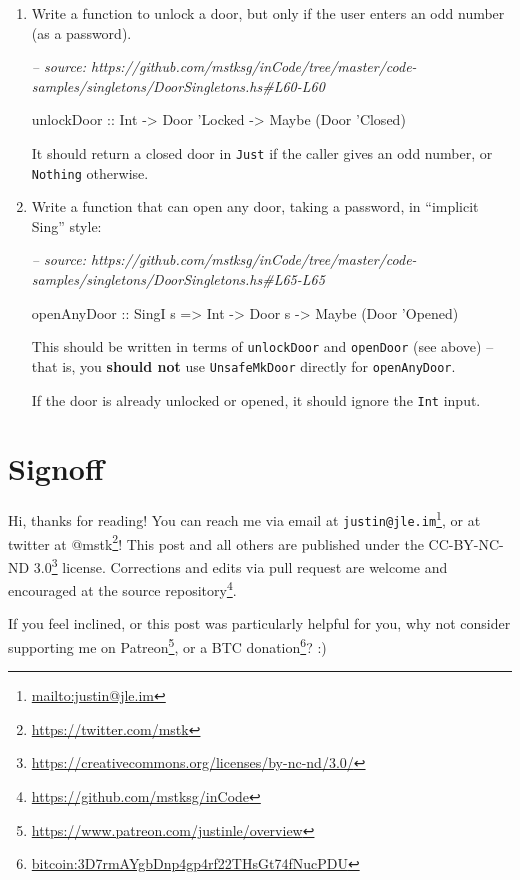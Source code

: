 \documentclass[]{article}
\newenvironment{Shaded}{}{}
\newcommand{\CommentTok}[1]{\textcolor[rgb]{0.38,0.63,0.69}{\textit{#1}}}
\newcommand{\DataTypeTok}[1]{\textcolor[rgb]{0.56,0.13,0.00}{#1}}
\newcommand{\NormalTok}[1]{#1}
\newcommand{\OtherTok}[1]{\textcolor[rgb]{0.00,0.44,0.13}{#1}}
\renewcommand{\href}[2]{#2\footnote{\url{#1}}}
\begin{document}
\begin{enumerate}
\def\labelenumi{\arabic{enumi}.}
\item
  Write a function to unlock a door, but only if the user enters an odd number
  (as a password).

\begin{Shaded}
\begin{Highlighting}[]
\CommentTok{-- source: https://github.com/mstksg/inCode/tree/master/code-samples/singletons/DoorSingletons.hs#L60-L60}

\OtherTok{unlockDoor ::} \DataTypeTok{Int} \OtherTok{->} \DataTypeTok{Door}\NormalTok{ '}\DataTypeTok{Locked} \OtherTok{->} \DataTypeTok{Maybe}\NormalTok{ (}\DataTypeTok{Door}\NormalTok{ '}\DataTypeTok{Closed}\NormalTok{)}
\end{Highlighting}
\end{Shaded}

  It should return a closed door in \texttt{Just} if the caller gives an odd
  number, or \texttt{Nothing} otherwise.
\item
  Write a function that can open any door, taking a password, in ``implicit
  Sing'' style:

\begin{Shaded}
\begin{Highlighting}[]
\CommentTok{-- source: https://github.com/mstksg/inCode/tree/master/code-samples/singletons/DoorSingletons.hs#L65-L65}

\OtherTok{openAnyDoor ::} \DataTypeTok{SingI}\NormalTok{ s }\OtherTok{=>} \DataTypeTok{Int} \OtherTok{->} \DataTypeTok{Door}\NormalTok{ s }\OtherTok{->} \DataTypeTok{Maybe}\NormalTok{ (}\DataTypeTok{Door}\NormalTok{ '}\DataTypeTok{Opened}\NormalTok{)}
\end{Highlighting}
\end{Shaded}

  This should be written in terms of \texttt{unlockDoor} and \texttt{openDoor}
  (see above) -- that is, you \textbf{should not} use \texttt{UnsafeMkDoor}
  directly for \texttt{openAnyDoor}.

  If the door is already unlocked or opened, it should ignore the \texttt{Int}
  input.
\end{enumerate}

\hypertarget{signoff}{%
\section{Signoff}\label{signoff}}

Hi, thanks for reading! You can reach me via email at
\href{mailto:justin@jle.im}{\nolinkurl{justin@jle.im}}, or at twitter at
\href{https://twitter.com/mstk}{@mstk}! This post and all others are published
under the \href{https://creativecommons.org/licenses/by-nc-nd/3.0/}{CC-BY-NC-ND
3.0} license. Corrections and edits via pull request are welcome and encouraged
at \href{https://github.com/mstksg/inCode}{the source repository}.

If you feel inclined, or this post was particularly helpful for you, why not
consider \href{https://www.patreon.com/justinle/overview}{supporting me on
Patreon}, or a \href{bitcoin:3D7rmAYgbDnp4gp4rf22THsGt74fNucPDU}{BTC donation}?
:)
\end{document}
